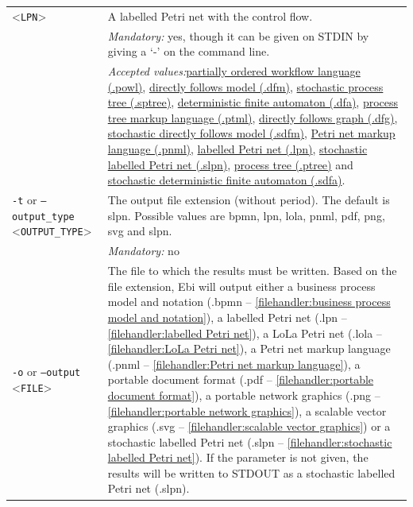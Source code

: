 {\begin{tabularx}{\linewidth}{lX}
<\texttt{LPN}>&A labelled Petri net with the control flow.\\
&\textit{Mandatory:} \quad yes, though it can be given on STDIN by giving a `-' on the command line.\\
&\textit{Accepted values:}\quad \hyperref[filehandler:partially ordered workflow language]{partially ordered workflow language (.powl)}, \hyperref[filehandler:directly follows model]{directly follows model (.dfm)}, \hyperref[filehandler:stochastic process tree]{stochastic process tree (.sptree)}, \hyperref[filehandler:deterministic finite automaton]{deterministic finite automaton (.dfa)}, \hyperref[filehandler:process tree markup language]{process tree markup language (.ptml)}, \hyperref[filehandler:directly follows graph]{directly follows graph (.dfg)}, \hyperref[filehandler:stochastic directly follows model]{stochastic directly follows model (.sdfm)}, \hyperref[filehandler:Petri net markup language]{Petri net markup language (.pnml)}, \hyperref[filehandler:labelled Petri net]{labelled Petri net (.lpn)}, \hyperref[filehandler:stochastic labelled Petri net]{stochastic labelled Petri net (.slpn)}, \hyperref[filehandler:process tree]{process tree (.ptree)} and \hyperref[filehandler:stochastic deterministic finite automaton]{stochastic deterministic finite automaton (.sdfa)}.\\
\texttt{-t} or \texttt{--output\_type} <\texttt{OUTPUT\_TYPE}> &
The output file extension (without period). The default is slpn. Possible values are bpmn, lpn, lola, pnml, pdf, png, svg and slpn.\\
&\textit{Mandatory:} \quad no\\
\texttt{-o} or \texttt{--output} <\texttt{FILE}> &
The file to which the results must be written. Based on the file extension, Ebi will output either a business process model and notation (.bpmn -- \cref{filehandler:business process model and notation}), a labelled Petri net (.lpn -- \cref{filehandler:labelled Petri net}), a LoLa Petri net (.lola -- \cref{filehandler:LoLa Petri net}), a Petri net markup language (.pnml -- \cref{filehandler:Petri net markup language}), a portable document format (.pdf -- \cref{filehandler:portable document format}), a portable network graphics (.png -- \cref{filehandler:portable network graphics}), a scalable vector graphics (.svg -- \cref{filehandler:scalable vector graphics}) or a stochastic labelled Petri net (.slpn -- \cref{filehandler:stochastic labelled Petri net}).
If the parameter is not given, the results will be written to STDOUT as a stochastic labelled Petri net (.slpn).\\

\end{tabularx}}
